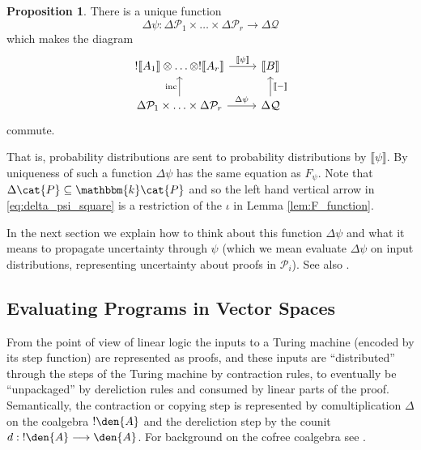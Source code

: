 \documentclass[english,letter paper,12pt,reqno]{article}
\theoremstyle{definition}
\newtheorem{proposition}[theorem]{Proposition}
\DeclareMathOperator{\inc}{inc}
\newcommand{\lto}{\longrightarrow}
\begin{document}
\begin{proposition}\label{prop:delta_psi}
    There is a unique function
    \begin{equation}
        \Delta \psi: \Delta \mathcal{P}_1 \times \ldots \times \Delta \mathcal{P}_r \lto \Delta \mathcal{Q}
    \end{equation}
    which makes the diagram
    \begin{equation}\label{eq:delta_psi_square}
        \begin{tikzcd}
            !\llbracket A_1 \rrbracket \otimes \ldots \otimes !\llbracket A_r \rrbracket\arrow[r,"{\llbracket \psi \rrbracket}"] & \llbracket B \rrbracket\\
            \Delta \mathcal{P}_1 \times \ldots \times \Delta \mathcal{P}_r\arrow[r,"{\Delta \psi}"]\arrow[u,"{\inc}"] & \Delta \mathcal{Q}\arrow[u, swap, "{\llbracket - \rrbracket}"]
        \end{tikzcd}
    \end{equation}
    commute.
\end{proposition}
That is, probability distributions are sent to probability distributions by $\llbracket \psi \rrbracket$. By uniqueness of such a function $\Delta \psi$ has the same equation as $F_\psi$. Note that $\Delta \cat{P} \subseteq \mathbbm{k} \cat{P}$ and so the left hand vertical arrow in \eqref{eq:delta_psi_square} is a restriction of the $\iota$ in Lemma \ref{lem:F_function}.

In the next section we explain how to think about this function $\Delta \psi$ and what it means to propagate uncertainty through $\psi$ (which we mean evaluate $\Delta \psi$ on input distributions, representing uncertainty about proofs in $\mathcal{P}_i$). See also \cite[Section 5.1]{clift2018derivatives}.


\subsection{Evaluating Programs in Vector Spaces}\label{section:eval_prog_vec}

From the point of view of linear logic the inputs to a Turing machine (encoded by its step function) are represented as proofs, and these inputs are ``distributed'' through the steps of the Turing machine by contraction rules, to eventually be ``unpackaged'' by dereliction rules and consumed by linear parts of the proof. Semantically, the contraction or copying step is represented by comultiplication $\Delta$ on the coalgebra ${!} \den{A}$ and the dereliction step by the counit $d: {!} \den{A} \lto \den{A}$. For background on the cofree coalgebra see \cite{murfet2014logic, murfet2015sweedler, clift2020cofree}.
\end{document}
